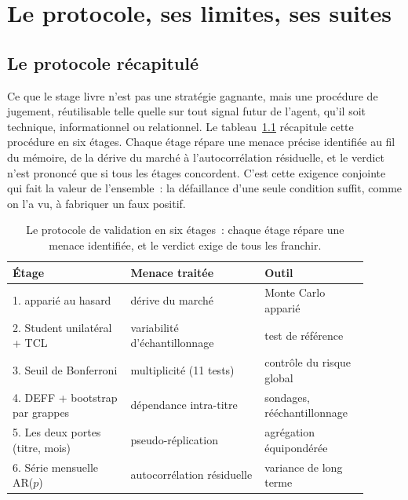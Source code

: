 \chapter{Le protocole, ses limites, ses suites}
\label{chap:protocole}

\section{Le protocole récapitulé}
\label{sec:protocole}

Ce que le stage livre n'est pas une stratégie gagnante, mais une
procédure de jugement, réutilisable telle quelle sur tout signal futur
de l'agent, qu'il soit technique, informationnel ou relationnel. Le
tableau~\ref{tab:protocole} récapitule cette procédure en six étages.
Chaque étage répare une menace précise identifiée au fil du mémoire, de
la dérive du marché à l'autocorrélation résiduelle, et le verdict n'est
prononcé que si tous les étages concordent. C'est cette exigence
conjointe qui fait la valeur de l'ensemble~: la défaillance d'une seule
condition suffit, comme on l'a vu, à fabriquer un faux positif.

\begin{table}[H]
\centering
\caption{Le protocole de validation en six étages~: chaque étage répare
une menace identifiée, et le verdict exige de tous les franchir.}
\label{tab:protocole}
\small
\begin{tabular}{@{}p{0.30\linewidth}p{0.34\linewidth}p{0.26\linewidth}@{}}
\toprule
Étage & Menace traitée & Outil \\
\midrule
1. \edgevar{} apparié au hasard & dérive du marché & Monte Carlo apparié \\
2. Student unilatéral + TCL & variabilité d'échantillonnage & test de référence \\
3. Seuil de Bonferroni & multiplicité (11 tests) & contrôle du risque global \\
4. DEFF + bootstrap par grappes & dépendance intra-titre & sondages, rééchantillonnage \\
5. Les deux portes (titre, mois) & pseudo-réplication & agrégation équipondérée \\
6. Série mensuelle AR($p$) & autocorrélation résiduelle & variance de long terme \\
\bottomrule
\end{tabular}
\end{table}

